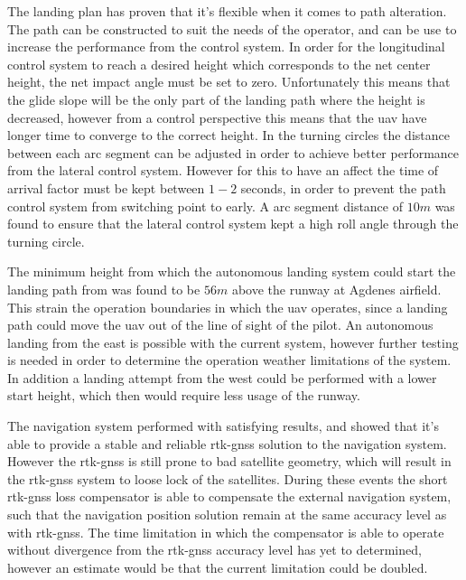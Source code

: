The landing plan has proven that it's flexible when it comes to path alteration. The path can be constructed to suit the needs of the operator, and can be use to increase the performance from the control system. In order for the longitudinal control system to reach a desired height which corresponds to the net center height, the net impact angle must be set to zero. Unfortunately this means that the glide slope will be the only part of the landing path where the height is decreased, however from a control perspective this means that the \gls{uav} have longer time to converge to the correct height. In the turning circles the distance between each arc segment can be adjusted in order to achieve better performance from the lateral control system. However for this to have an affect the time of arrival factor must be kept between $1-2$ seconds, in order to prevent the path control system from switching point to early. A arc segment distance of $10 m$ was found to ensure that the lateral control system kept a high roll angle through the turning circle.

The minimum height from which the autonomous landing system could start the landing path from was found to be $56 m$ above the runway at Agdenes airfield. This strain the operation boundaries in which the \gls{uav} operates, since a landing path could move the \gls{uav} out of the line of sight of the pilot. An autonomous landing from the east is possible with the current system, however further testing is needed in order to determine the operation weather limitations of the system. In addition a landing attempt from the west could be performed with a lower start height, which then would require less usage of the runway.

The navigation system performed with satisfying results, and showed that it's able to provide a stable and reliable \gls{rtk-gnss} solution to the navigation system. However the \gls{rtk-gnss} is still prone to bad satellite geometry, which will result in the \gls{rtk-gnss} system to loose lock of the satellites. During these events the short \gls{rtk-gnss} loss compensator is able to compensate the external navigation system, such that the navigation position solution remain at the same accuracy level as with \gls{rtk-gnss}. The time limitation in which the compensator is able to operate without divergence from the \gls{rtk-gnss} accuracy level has yet to determined,  however an estimate would be that the current limitation could be doubled.